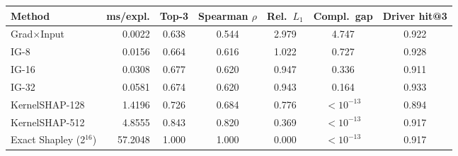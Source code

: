 \begin{tabular}{lrccccc}
\toprule
Method & ms/expl. & Top-3 & Spearman $\rho$ & Rel.\ $L_1$ & Compl.\ gap & Driver hit@3 \\
\midrule
Grad$\times$Input & 0.0022 & 0.638 & 0.544 & 2.979 & 4.747 & 0.922 \\
IG-8 & 0.0156 & 0.664 & 0.616 & 1.022 & 0.727 & 0.928 \\
IG-16 & 0.0308 & 0.677 & 0.620 & 0.947 & 0.336 & 0.911 \\
IG-32 & 0.0581 & 0.674 & 0.620 & 0.943 & 0.164 & 0.933 \\
KernelSHAP-128 & 1.4196 & 0.726 & 0.684 & 0.776 & $<10^{-13}$ & 0.894 \\
KernelSHAP-512 & 4.8555 & 0.843 & 0.820 & 0.369 & $<10^{-13}$ & 0.917 \\
Exact Shapley (2$^{16}$) & 57.2048 & 1.000 & 1.000 & 0.000 & $<10^{-13}$ & 0.917 \\
\bottomrule
\end{tabular}
